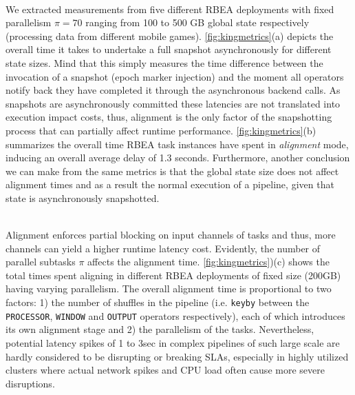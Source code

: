  \\
We extracted measurements from five different RBEA deployments with fixed parallelism $\pi = 70$ ranging from 100 to 500 GB global state respectively (processing data from different mobile games). \autoref{fig:kingmetrics}(a) depicts the overall time it takes to undertake a full snapshot asynchronously for different state sizes. Mind that this simply measures the time difference between the invocation of a snapshot (epoch marker injection) and the moment all operators notify back they have completed it through the asynchronous backend calls. As snapshots are asynchronously committed these latencies are not translated into execution impact costs, thus, alignment is the only factor of the snapshotting process that can partially affect runtime performance. \autoref{fig:kingmetrics}(b) summarizes the overall time RBEA task instances have spent in \emph{alignment} mode, inducing an overall average delay of 1.3 seconds. Furthermore, another conclusion we can make from the same metrics is that the global state size does not affect alignment times and as a result the normal execution of a pipeline, given that state is asynchronously snapshotted.

 \\
Alignment enforces partial blocking  on input channels of tasks and thus, more channels can yield a higher runtime latency cost. Evidently, the number of parallel subtasks $\pi$ affects the alignment time. \autoref{fig:kingmetrics})(c) shows the total times spent aligning in different RBEA deployments of fixed size (200GB) having varying parallelism. The overall alignment time is proportional to two factors: 1) the number of shuffles in the pipeline (i.e. \texttt{keyby} between the \texttt{PROCESSOR}, \texttt{WINDOW} and \texttt{OUTPUT} operators respectively), each of which introduces its own alignment stage and 2) the parallelism of the tasks. Nevertheless, potential latency spikes of 1 to 3sec in complex pipelines of such large scale are hardly considered to be disrupting or breaking SLAs, especially in highly utilized clusters where actual network spikes and CPU load often cause more severe disruptions.